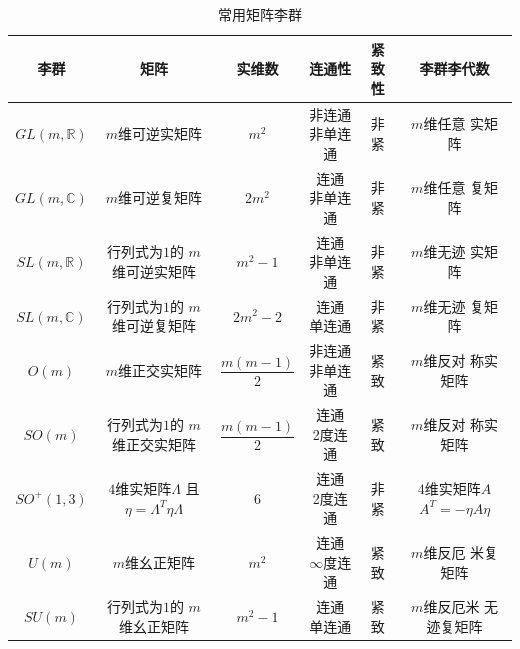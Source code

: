 \begin{table}[htb]
    \centering
    \caption{常用矩阵李群} \label{chlg:tab_groups}
    \begin{tabular}{|*6{c|}}
        \hline
        李群 &矩阵 & 实维数 &连通性  & 紧致性 & 李群李代数   \\        \hline
        $GL(m,\mathbb{R})$ & $m$维可逆实矩阵 & $m^2$  & \makecell{非连通\\非单连通 }
        & 非紧 & \makecell{$m$维任意\\ 实矩阵}   \\ \hline
        $GL(m,\mathbb{C})$& $m$维可逆复矩阵 & $2 m^2$ & \makecell{连通 \\非单连通 }
        & 非紧 & \makecell{$m$维任意\\ 复矩阵}  \\ \hline
        $SL(m,\mathbb{R})$ & \makecell{行列式为$1$的\\$m$维可逆实矩阵} & $m^2-1$  &  \makecell{连通 \\ 非单连通 } 
        & 非紧 & \makecell{$m$维无迹\\ 实矩阵}  \\ \hline
        $SL(m,\mathbb{C})$ & \makecell{行列式为$1$的\\$m$维可逆复矩阵} & $2m^2-2$ & \makecell{连通\\单连通 }
        & 非紧 & \makecell{$m$维无迹\\ 复矩阵}  \\ \hline
        $O(m)$  & $m$维正交实矩阵 & $\dfrac{m(m-1)}{2}$  & \makecell{非连通\\非单连通 } 
        & 紧致 & \makecell{$m$维反对\\ 称实矩阵} \\ \hline
        $SO(m)$ & \makecell{行列式为$1$的\\$m$维正交实矩阵} &$\dfrac{m(m-1)}{2}$ & \makecell{连通\\2度连通 }
        & 紧致 & \makecell{$m$维反对\\ 称实矩阵}  \\ \hline
        $SO^{+}(1,3)$ & \makecell{$4$维实矩阵$\Lambda$\\且$\eta=\Lambda^T \eta \Lambda$} & $6$ & \makecell{连通\\2度连通 }
        & 非紧 & \makecell{$4$维实矩阵$A$\\$A^T=- \eta A \eta $} \\ \hline
        $U(m)$ & $m$维幺正矩阵 & $m^2$ & \makecell{连通 \\$\infty$度连通 }
        & 紧致 &  \makecell{$m$维反厄\\ 米复矩阵} \\ \hline
        $SU(m)$ & \makecell{行列式为$1$的\\$m$维幺正矩阵} & $m^2-1$ & \makecell{连通\\单连通 }
        & 紧致 & \makecell{$m$维反厄米\\无迹复矩阵} \\ \hline
    \end{tabular}
\end{table}

